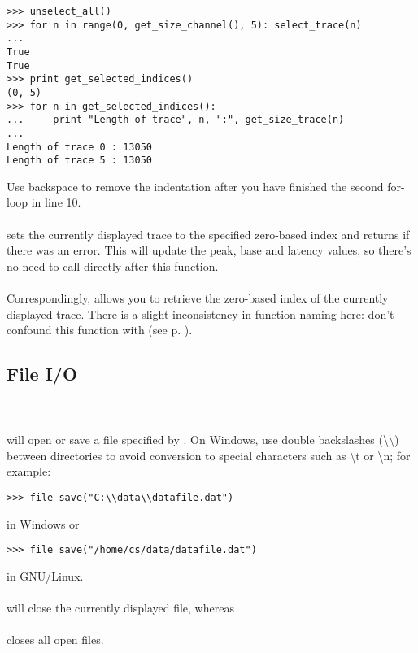 \begin{lstlisting}
>>> unselect_all()
>>> for n in range(0, get_size_channel(), 5): select_trace(n)
...
True
True
>>> print get_selected_indices()
(0, 5)
>>> for n in get_selected_indices():
...     print "Length of trace", n, ":", get_size_trace(n)
... 
Length of trace 0 : 13050
Length of trace 5 : 13050
\end{lstlisting}
Use backspace to remove the indentation after you have finished the second for-loop in line 10.\smallskip \\
\\
sets the currently displayed trace to the specified zero-based index and returns  if there was an error. This will update the peak, base and latency values, so there's no need to call  directly after this function. \smallskip \\
\\
Correspondingly,  allows you to retrieve the zero-based index of the currently displayed trace. There is a slight inconsistency in function naming here: don't confound this function with  (see p. \pageref{gettrace}).

\subsection{File I/O}
\noindent{}\\
\noindent{}\\
\noindent will open or save a file specified by . On Windows, use double backslashes (\textbackslash\textbackslash) between directories to avoid conversion to special characters such as \textbackslash{t} or \textbackslash{n}; for example:
\begin{lstlisting}
>>> file_save("C:\\data\\datafile.dat")
\end{lstlisting}
in Windows or
\begin{lstlisting}
>>> file_save("/home/cs/data/datafile.dat")
\end{lstlisting}
in GNU/Linux. \smallskip \\
\noindent{}\\
will close the currently displayed file, whereas \smallskip \\
\noindent{}\\
closes all open files.

